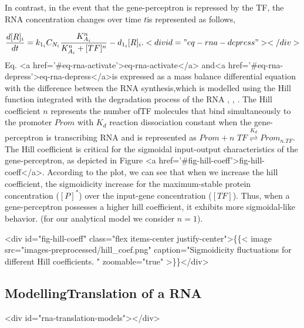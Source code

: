 \documentclass[twocolumn]{biophys-new}
\begin{document}
{{\begin{equation}
\end{equation} 


In contrast, in the event that the gene-perceptron is repressed by the TF, the RNA concentration changes over time $t$is represented as follows, 

\vspace{-0.5em}
\begin{equation}
\dfrac{d[R]_i}{dt}= k_{1_i} C_{N_i} \dfrac{K_{A_i}^n}{K_{A_i}^n + [TF]^n}- d_{1_i} [R]_i. <div id="eq-rna-depress"></div>

\end{equation}
 Eq. <a href='#eq-rna-activate'>eq-rna-activate</a> and<a href='#eq-rna-depress'>eq-rna-depress</a>is expressed as a mass balance differential equation with the difference between the RNA synthesis,which is modelled using the Hill function integrated with the degradation process of the RNA \cite{yugi2019rate}, \cite{alon2019introduction}, \cite{thompson2020multiple}. The Hill coefficient $n$ represents the number ofTF molecules that bind simultaneously to the promoter $Prom$ with $K_d$ reaction dissociation constant when the gene-perceptron is transcribing RNA \cite{santillan2008use} and is represented as $Prom + n \,\, TF \stackrel{K_d}{\rightleftharpoons} Prom_{n.TF}$.
The Hill coefficient is critical for the sigmoidal input-output characteristics of the gene-perceptron, as depicted in Figure <a href='#fig-hill-coeff'>fig-hill-coeff</a>. According to the plot, we can see that when we increase the hill coefficient, the sigmoidicity increase for the maximum-stable protein concentration ($[P]^*$) over the input-gene concentration ($[TF]$). Thus, when a gene-perceptron possesses a higher hill coefficient, it exhibits more sigmoidal-like behavior. (for our analytical model we consider $n=1$). 

<div id="fig-hill-coeff" class="flex items-center justify-center">\{\{< image src="images-preprocessed/hill_coef.png" caption="Sigmoidicity fluctuations for different Hill coefficients. \vspace{1em}" zoomable="true" >\}\}</div>



\subsection{ModellingTranslation of a RNA} <div id="rna-translation-models"></div>


}}
\end{document}
